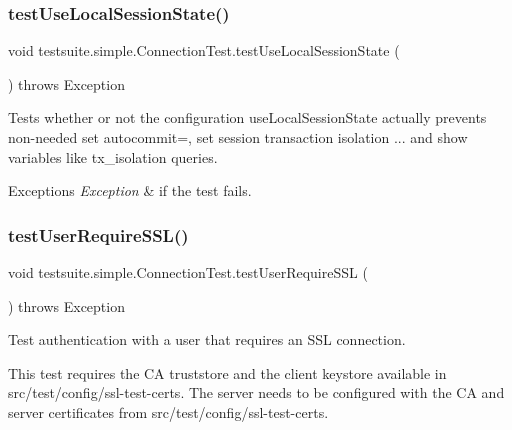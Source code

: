 \subsubsection{\texorpdfstring{test\+Use\+Local\+Session\+State()}{testUseLocalSessionState()}}
{\footnotesize\ttfamily void testsuite.\+simple.\+Connection\+Test.\+test\+Use\+Local\+Session\+State (\begin{DoxyParamCaption}{ }\end{DoxyParamCaption}) throws Exception}

Tests whether or not the configuration \textquotesingle{}use\+Local\+Session\+State\textquotesingle{} actually prevents non-\/needed \textquotesingle{}set autocommit=\textquotesingle{}, \textquotesingle{}set session transaction isolation ...\textquotesingle{} and \textquotesingle{}show variables like tx\+\_\+isolation\textquotesingle{} queries.


\begin{DoxyExceptions}{Exceptions}
{\em Exception} & if the test fails. \\
\hline
\end{DoxyExceptions}
\mbox{\label{classtestsuite_1_1simple_1_1_connection_test_a0c148553019aa296f7f80dfc7edf1e49}} 
\subsubsection{\texorpdfstring{test\+User\+Require\+S\+S\+L()}{testUserRequireSSL()}}
{\footnotesize\ttfamily void testsuite.\+simple.\+Connection\+Test.\+test\+User\+Require\+S\+SL (\begin{DoxyParamCaption}{ }\end{DoxyParamCaption}) throws Exception}

Test authentication with a user that requires an S\+SL connection.

This test requires the CA truststore and the client keystore available in src/test/config/ssl-\/test-\/certs. The server needs to be configured with the CA and server certificates from src/test/config/ssl-\/test-\/certs. \mbox{\label{classtestsuite_1_1simple_1_1_connection_test_a8ccc3af85ebbc2d7b461b32b29d8982c}} 
